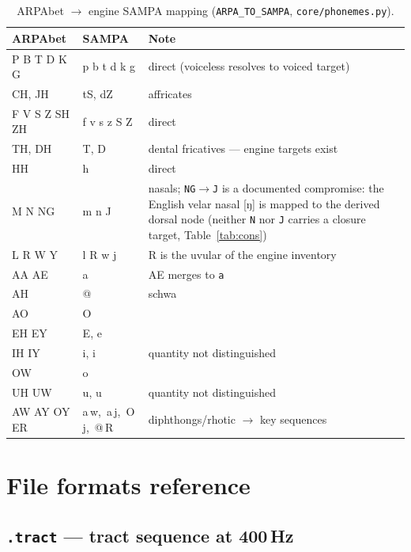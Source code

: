 \documentclass[11pt,a4paper]{article}
\begin{document}
\begin{table}[t]
\centering
\small
\begin{tabular}{@{}llp{5.9cm}@{}}
\toprule
\textbf{ARPAbet} & \textbf{SAMPA} & \textbf{Note} \\
\midrule
P B T D K G & p b t d k g & direct (voiceless resolves to voiced target) \\
CH, JH & tS, dZ & affricates \\
F V S Z SH ZH & f v s z S Z & direct \\
TH, DH & T, D & dental fricatives --- engine targets exist \\
HH & h & direct \\
M N NG & m n J & nasals; \texttt{NG}\(\to\)\texttt{J} is a documented
  compromise: the English velar nasal [ŋ] is mapped to the derived
  dorsal node (neither \texttt{N} nor \texttt{J} carries a closure
  target, Table~\ref{tab:cons}) \\
L R W Y & l R w j & R is the uvular of the engine inventory \\
AA AE & a & AE merges to \texttt{a} \\
AH & @ & schwa \\
AO & O & \\
EH EY & E, e & \\
IH IY & i, i & quantity not distinguished \\
OW & o & \\
UH UW & u, u & quantity not distinguished \\
AW AY OY ER & a\,w,\ a\,j,\ O\,j,\ @\,R & diphthongs/rhotic \(\to\) key sequences \\
\bottomrule
\end{tabular}
\caption{ARPAbet \(\to\) engine SAMPA mapping
(\texttt{ARPA\_TO\_SAMPA}, \texttt{core/phonemes.py}).}
\label{tab:arpa}
\end{table}

\section{File formats reference}\label{sec:formats}

\subsection{\texttt{.tract} --- tract sequence at 400\,Hz}
\end{document}
